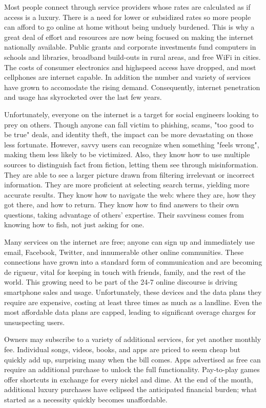 Most people connect through service providers whose rates are calculated
as if access is a luxury. There is a need for lower or subsidized rates
so more people can afford to go online at home without being unduely
burdened. This is why a great deal of effort and resources are now being
focused on making the internet nationally available. Public grants
and corporate investments fund computers in schools and libraries,
broadband build-outs in rural areas, and free WiFi in cities. The costs
of consumer electronics and highspeed access have dropped, and most
cellphones are internet capable. In addition the number and variety
of services have grown to accomodate the rising demand. Consequently,
internet penetration and usage has skyrocketed over the last few years.


Unfortunately, everyone on the internet is a target for social engineers
looking to prey on others. Though anyone can fall victim to phishing,
scams, "too good to be true" deals, and identity theft, the impact can
be more devastating on those less fortunate. However, savvy users can
recognize when something "feels wrong", making them less likely to be
victimized. Also, they know how to use multiple sources to distinguish
fact from fiction, letting them see through misinformation. They
are able to see a larger picture drawn from filtering irrelevant or
incorrect information. They are more proficient at selecting search
terms, yielding more accurate results. They know how to navigate the
web: where they are, how they got there, and how to return. They know
how to find answers to their own questions, taking advantage of others'
expertise. Their savviness comes from knowing how to fish, not just
asking for one.


Many services on the internet are free; anyone can sign up and
immediately use email, Facebook, Twitter, and innumerable other online
communities. These connections have grown into a standard form of
communication and are becoming de rigueur, vital for keeping in touch
with friends, family, and the rest of the world. This growing need to
be part of the 24-7 online discourse is driving smartphone sales and
usage. Unfortunately, these devices and the data plans they require
are expensive, costing at least three times as much as a landline.
Even the most affordable data plans are capped, leading to significant
overage charges for unsuspecting users. 

Owners may subscribe to a variety of additional services, for yet
another monthly fee. Individual songs, videos, books, and apps are
priced to seem cheap but quickly add up, surprising many when the bill
comes. Apps advertised as free can require an additional purchase to
unlock the full functionality. Pay-to-play games offer shortcuts in
exchange for every nickel and dime. At the end of the month, additional
luxury purchases have eclipsed the anticipated financial burden; what
started as a necessity quickly becomes unaffordable.

